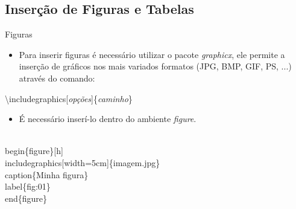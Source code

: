 \documentclass{beamer}
\begin{document}



\subsection{Inserção de Figuras e Tabelas}

\begin{frame}[fragile]{Figuras}
    \begin{itemize}
    \item Para inserir figuras é necessário utilizar o pacote \textit{graphicx}, ele permite a inserção de gráficos nos mais variados formatos (JPG, BMP, GIF, PS, ...) através do comando:
    \end{itemize}
    
    \alert{\textbackslash includegraphics[\textit{opções}]\{\textit{caminho}\}}

    \begin{itemize}
    \item É necessário inserí-lo dentro do ambiente \textit{figure}.
    \end{itemize}

    \begin{example}
        \begin{semiverbatim}
\small\\begin\{figure\}[h]
\\includegraphics[width=5cm]\{imagem.jpg\}
\\caption\{Minha figura\}
\\label\{fig:01\}
\\end\{figure\}
\end{semiverbatim}
    \end{example}
\end{frame}
\end{document}
